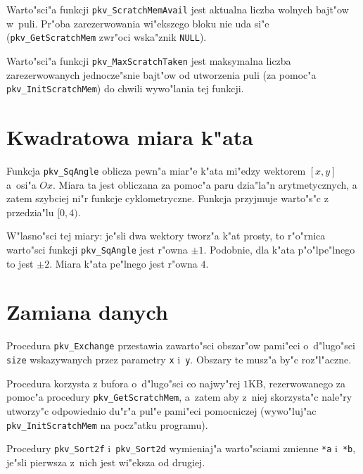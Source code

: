 \newpage
Warto"sci"a funkcji \texttt{pkv\_ScratchMemAvail} jest aktualna liczba
wolnych bajt"ow w~puli. Pr"oba zarezerwowania wi"ekszego bloku nie uda si"e
(\texttt{pkv\_GetScratchMem} zwr"oci wska"znik \texttt{NULL}).

\vspace{\bigskipamount}
Warto"sci"a funkcji \texttt{pkv\_MaxScratchTaken} jest maksymalna liczba
zarezerwowanych jednocze"snie bajt"ow od utworzenia puli (za pomoc"a
\texttt{pkv\_InitScratchMem}) do chwili wywo"lania tej funkcji.


\section{Kwadratowa miara k"ata}

\mbox{}
\indent
Funkcja \texttt{pkv\_SqAngle} oblicza pewn"a miar"e k"ata mi"edzy wektorem $[x,y]$
a~osi"a $Ox$. Miara ta jest obliczana za pomoc"a paru dzia"la"n
arytmetycznych, a zatem szybciej ni"r funkcje cyklometryczne. Funkcja
przyjmuje warto"s"c z przedzia"lu $[0,4)$.

W"lasno"sci tej miary: je"sli dwa wektory tworz"a k"at prosty, to r"o"rnica
warto"sci funkcji \texttt{pkv\_SqAngle} jest r"owna $\pm 1$. Podobnie, dla k"ata
p"o"lpe"lnego to jest $\pm 2$. Miara k"ata pe"lnego jest r"owna $4$.


\section{Zamiana danych}

\hspace*{\parindent}
Procedura \texttt{pkv\_Exchange} przestawia zawarto"sci obszar"ow pami"eci
o~d"lugo"sci \texttt{size} wskazywanych przez parametry \texttt{x}
i~\texttt{y}. Obszary te musz"a by"c roz"l"aczne.

Procedura korzysta z bufora o~d"lugo"sci co najwy"rej $1$KB, rezerwowanego za
pomoc"a procedury \texttt{pkv\_GetScratchMem}, a~zatem aby z~niej
skorzysta"c nale"ry utworzy"c odpowiednio du"r"a pul"e pami"eci pomocniczej
(wywo"luj"ac \texttt{pkv\_InitScratchMem} na pocz"atku programu).

\vspace{\bigskipamount}
Procedury \texttt{pkv\_Sort2f} i~\texttt{pkv\_Sort2d} wymieniaj"a
warto"sciami zmienne \texttt{*a} i~\texttt{*b}, je"sli pierwsza z~nich jest
wi"eksza od drugiej.


